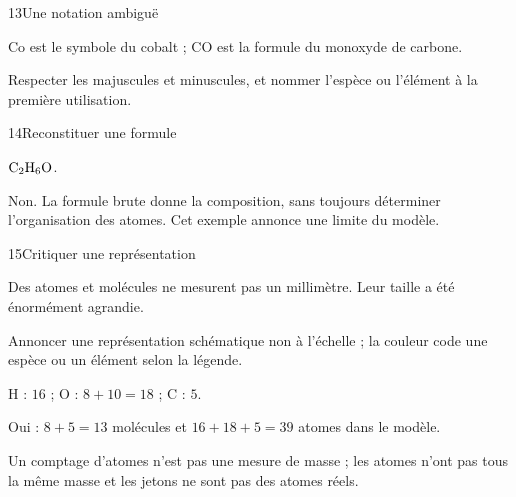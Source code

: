 \par\noindent\begin{minipage}{\linewidth}
\begin{corrige}{13}{Une notation ambiguë}
\begin{questions}
\item Co est le symbole du cobalt ; CO est la formule du monoxyde de carbone.
\item Respecter les majuscules et minuscules, et nommer l’espèce ou l’élément à la première utilisation.
\end{questions}
\end{corrige}
\end{minipage}
\par\noindent\begin{minipage}{\linewidth}
\begin{corrige}{14}{Reconstituer une formule}
\begin{questions}
\item $\ce{C2H6O}$.
\item Non. La formule brute donne la composition, sans toujours déterminer l’organisation des atomes. Cet exemple annonce une limite du modèle.
\end{questions}
\end{corrige}
\end{minipage}
\par\noindent\begin{minipage}{\linewidth}
\begin{corrige}{15}{Critiquer une représentation}
\begin{questions}
\item Des atomes et molécules ne mesurent pas un millimètre. Leur taille a été énormément agrandie.
\item Annoncer une représentation schématique non à l’échelle ; la couleur code une espèce ou un élément selon la légende.
\end{questions}
\end{corrige}
\end{minipage}
\par\noindent\begin{minipage}{\linewidth}
\label{cor-defi-5}\begin{questions}
\item H : $16$ ; O : $8+10=18$ ; C : $5$.
\item Oui : $8+5=13$ molécules et $16+18+5=39$ atomes dans le modèle.
\item Un comptage d’atomes n’est pas une mesure de masse ; les atomes n’ont pas tous la même masse et les jetons ne sont pas des atomes réels.
\end{questions}
\end{minipage}
